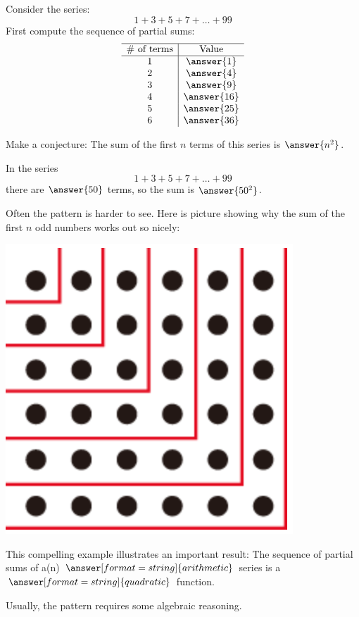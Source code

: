 \documentclass[nooutcomes]{ximera}
\begin{document}
\begin{problem}
Consider the series: 
\[
1+3+5+7+\dots+99
\]
First compute the sequence of partial sums: 
\[
\begin{array}{c|c} \hline
\text{\# of terms} & \text{Value} \\ \hline
1 & \answer{1} \\
2 & \answer{4} \\
3 & \answer{9}\\
4 & \answer{16}\\
5 & \answer{25}\\
6 & \answer{36}\\
\end{array}
\]
\begin{problem}
Make a conjecture: The sum of the first $n$ terms of this series is $\answer{n^2}$. 

In the series
\[
1+3+5+7+\dots+99
\]
there are $\answer{50}$ terms, so the sum is $\answer{50^2}$.  

\begin{problem}[correct]
Often the pattern is harder to see.  Here is picture showing why the sum of the first $n$ odd numbers works out so nicely: 
\begin{image}
\includegraphics[scale=0.5]{sumOdds.png}
\end{image}

This compelling example illustrates an important result:  The sequence of partial sums of a(n) $\answer[format=string]{arithmetic}$ series is a $\answer[format=string]{quadratic}$ function.  

Usually, the pattern requires some algebraic reasoning.  
\end{problem}
\end{problem}
\end{problem}
\end{document}
